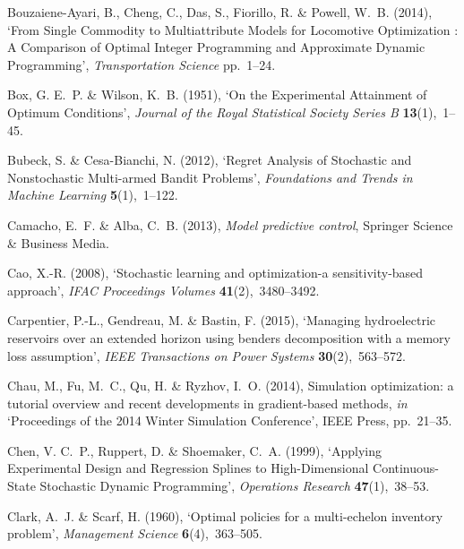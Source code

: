 \documentclass[11pt,oneside,fleqn,reqno,titlepage]{article}
\begin{document}
\begin{thebibliography}{xx}
Bouzaiene-Ayari, B., Cheng, C., Das, S., Fiorillo, R. \& Powell, W.~B.  (2014),
  `{From Single Commodity to Multiattribute Models for Locomotive Optimization
  : A Comparison of Optimal Integer Programming and Approximate Dynamic
  Programming}', {\em Transportation Science} pp.~1--24.

Box, G. E.~P. \& Wilson, K.~B.  (1951), `{On the Experimental Attainment of
  Optimum Conditions}', {\em Journal of the Royal Statistical Society Series B}
  {\bf 13}(1),~1--45.

Bubeck, S. \& Cesa-Bianchi, N.  (2012), `{Regret Analysis of Stochastic and
  Nonstochastic Multi-armed Bandit Problems}', {\em Foundations and Trends in
  Machine Learning} {\bf 5}(1),~1--122.

Camacho, E.~F. \& Alba, C.~B.  (2013), {\em Model predictive control}, Springer
  Science \& Business Media.

Cao, X.-R.  (2008), `Stochastic learning and optimization-a sensitivity-based
  approach', {\em IFAC Proceedings Volumes} {\bf 41}(2),~3480--3492.

Carpentier, P.-L., Gendreau, M. \& Bastin, F.  (2015), `Managing hydroelectric
  reservoirs over an extended horizon using benders decomposition with a memory
  loss assumption', {\em IEEE Transactions on Power Systems} {\bf
  30}(2),~563--572.

Chau, M., Fu, M.~C., Qu, H. \& Ryzhov, I.~O.  (2014), Simulation optimization:
  a tutorial overview and recent developments in gradient-based methods, {\em
  in} `Proceedings of the 2014 Winter Simulation Conference', IEEE Press,
  pp.~21--35.

Chen, V. C.~P., Ruppert, D. \& Shoemaker, C.~A.  (1999), `{Applying
  Experimental Design and Regression Splines to High-Dimensional
  Continuous-State Stochastic Dynamic Programming}', {\em Operations Research}
  {\bf 47}(1),~38--53.

Clark, A.~J. \& Scarf, H.  (1960), `{Optimal policies for a multi-echelon
  inventory problem}', {\em Management Science} {\bf 6}(4),~363--505.


\end{thebibliography}
\end{document}
